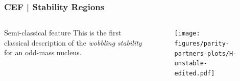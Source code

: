 \documentclass{beamer}
\begin{document}
\begin{frame}
	\frametitle{CEF | Stability Regions}
	\vspace{-0.5cm}
	\begin{columns}
		\begin{column}{0.45\textwidth}
			\begin{table}
				\centering
				\caption{The minimum points of $\mathcal{H}$. Using the MOIs from the fitting procedure}
			\end{table}		
			\begin{alertblock}{Semi-classical feature}
				This is the first classical description of the \emph{wobbling stability} for an odd-mass nucleus.
			\end{alertblock}
		\end{column}
		\begin{column}{0.55\textwidth}
			\begin{figure}
				\centering
				\texttt{[image: figures/parity-partners-plots/H-unstable-edited.pdf]}
			\end{figure}
		\end{column}
	\end{columns}
\end{frame}
\end{document}
